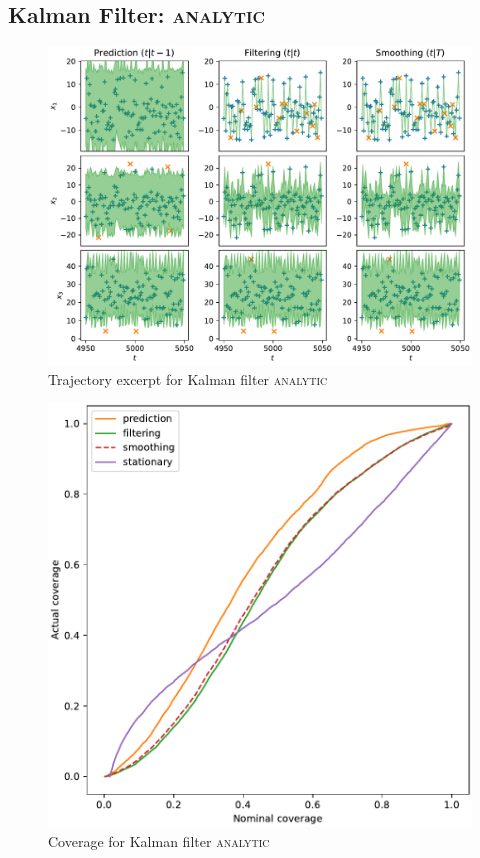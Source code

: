 \subsection{Kalman Filter: {\textsc{analytic}}}
\begin{figure}[H]
\begin{center}
\includegraphics[width=\linewidth]{generated/trajectory/Method.ANALYTIC-Recalibrate.NO.pdf}
\end{center}
\caption{Trajectory excerpt for Kalman filter \textsc{{\textsc{analytic}}}}
\end{figure}
\begin{figure}[H]
\begin{center}
\includegraphics[width=\linewidth]{generated/coverage/Method.ANALYTIC-Recalibrate.NO.pdf}
\end{center}
\caption{Coverage for Kalman filter \textsc{{\textsc{analytic}}}}
\end{figure}
